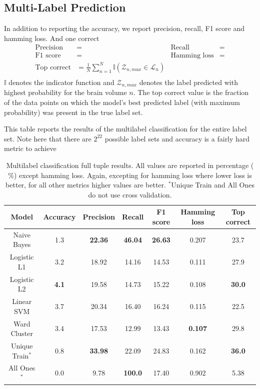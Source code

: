 \documentclass{article} %
\begin{document}
 \subsection{Multi-Label Prediction}
In addition to reporting the accuracy, we report precision, recall, F1 score and hamming loss. And one correct
\begin{align*}
 \text{Precision} &= & \text{Recall}&= \\
 \text{F1 score} &= & \text{Hamming loss}&= \\
 \text{Top correct} &=\frac{1}{N} \displaystyle\sum_{n=1}^{N} \mathbb{I}(\mathcal{Z}_{n,max} \in \mathcal{L}_n)& & \\
\end{align*}
$\mathbb{I}$ denotes the indicator function and $\mathcal{Z}_{n,max}$ denotes the label predicted with highest probability for the brain volume $n$. The top correct value is the fraction of the data points on which the model's best predicted label (with maximum probability) was present in the true label set.

This table reports the results of the multilabel classification for the entire label set. Note here that there are $2^{22}$ possible label sets and accuracy is a fairly hard metric to achieve
\begin{table}[h]
\begin{center}
\begin{tabular}{|c|c|c|c|c|c|c|}
\hline
 Model       & Accuracy & Precision & Recall    & F1 score  & Hamming loss & Top correct\\ \hline
 Naive Bayes & 1.3      & \bf{22.36}& \bf{46.04}& \bf{26.63}& 0.207     & 23.7      \\ \hline
 Logistic L1 & 3.2      & 18.92     & 14.16     & 14.53     & 0.111     & 27.9      \\ \hline
 Logistic L2 & \bf{4.1} & 19.58     & 14.73     & 15.22     & 0.108     & \bf{30.0} \\ \hline
 Linear SVM  & 3.7      & 20.34     & 16.40     & 16.24     & 0.115     & 22.5      \\ \hline
 Ward Cluster& 3.4      & 17.53     & 12.99     & 13.43     & \bf{0.107}& 29.8      \\ \hline \hline
 Unique Train$^*$& 0.8      & \bf{33.98}& 22.09     & 24.83     & 0.162     & \bf{36.0} \\ \hline
 All Ones$^*$    & 0.0      & 9.78      & \bf{100.0}& 17.40     & 0.902     & 5.38      \\ \hline
\end{tabular}
\caption{Multilabel classification full tuple results. All values are reported in percentage ($\%$) except hamming loss. Again, excepting for hamming loss where lower loss is better, for all other metrics higher values are better. $^*$Unique Train and All Ones do not use cross validation.}
\end{center}
\end{table}
\end{document}
